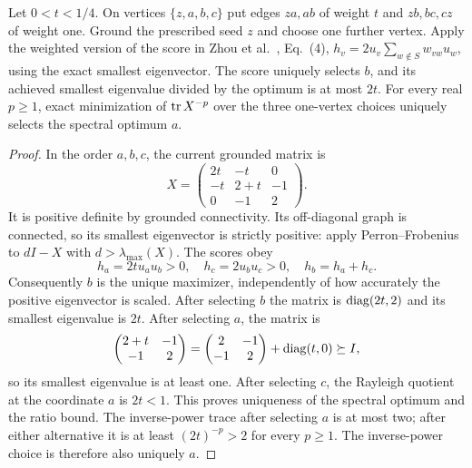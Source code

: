 \begin{proposition}\label{prop:zhoustress}
Let $0<t<1/4$. On vertices $\{z,a,b,c\}$ put edges $za,ab$
of weight $t$ and $zb,bc,cz$ of weight one. Ground the prescribed
seed $z$ and choose one further vertex. Apply the weighted version
of the score in Zhou et al.\ \cite{zhou2023}, Eq.~(4),
$h_v=2u_v\sum_{w\notin S}w_{vw}u_w$, using the exact smallest
eigenvector. The score uniquely selects $b$, and its achieved
smallest eigenvalue divided by the optimum is at most $2t$.
For every real $p\geq1$, exact minimization of $\operatorname{tr} X^{-p}$
over the three one-vertex choices uniquely selects the spectral
optimum $a$.
\end{proposition}
\begin{proof}
In the order $a,b,c$, the current grounded matrix is
\[
 X=\begin{pmatrix}2t&-t&0\\-t&2+t&-1\\0&-1&2\end{pmatrix}.
\]
It is positive definite by grounded connectivity. Its off-diagonal
graph is connected, so its smallest eigenvector is strictly positive:
apply Perron--Frobenius to $dI-X$ with $d>\lambda_{\max}(X)$.
The scores obey
\[
 h_a=2tu_au_b>0,\quad h_c=2u_bu_c>0,\quad h_b=h_a+h_c.
\]
Consequently $b$ is the unique maximizer, independently of how
accurately the positive eigenvector is scaled. After selecting $b$
the matrix is $\operatorname{diag}(2t,2)$ and its smallest eigenvalue is $2t$.
After selecting $a$, the matrix is
\[
 \begin{pmatrix}2+t&-1\\-1&2\end{pmatrix}
 =\begin{pmatrix}2&-1\\-1&2\end{pmatrix}
   +\operatorname{diag}(t,0)\succeq I,
\]
so its smallest eigenvalue is at least one. After selecting $c$,
the Rayleigh quotient at the coordinate $a$ is $2t<1$.
This proves uniqueness of the spectral optimum and the ratio bound.
The inverse-power trace after selecting $a$ is at most two; after
either alternative it is at least $(2t)^{-p}>2$ for every $p\geq1$.
The inverse-power choice is therefore also uniquely $a$.
\end{proof}

